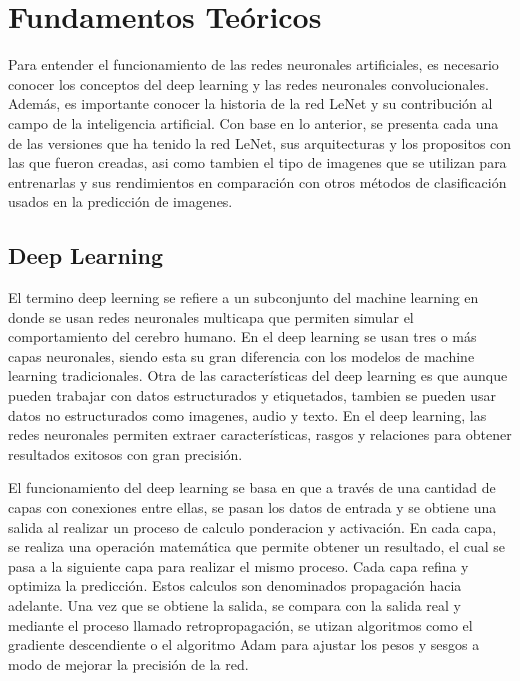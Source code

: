 \section{Fundamentos Teóricos}

Para entender el funcionamiento de las redes neuronales artificiales, 
es necesario conocer los conceptos del deep learning y las redes neuronales
convolucionales. Además, es importante conocer la historia de la red LeNet
y su contribución al campo de la inteligencia artificial. Con base 
en lo anterior, se presenta cada una de las versiones que ha tenido la red
LeNet, sus arquitecturas y los propositos con las que fueron creadas, asi
como tambien el tipo de imagenes que se utilizan para entrenarlas y 
sus rendimientos en comparación con otros métodos de clasificación
usados en la predicción de imagenes.

\subsection{Deep Learning}
El termino deep leerning se refiere a un subconjunto del machine learning
en donde se usan redes neuronales multicapa que permiten simular
el comportamiento del cerebro humano. En el deep learning se usan
tres o más capas neuronales, siendo esta su gran diferencia con los
modelos de machine learning tradicionales. Otra de las características
del deep learning es que aunque pueden trabajar con datos estructurados
y etiquetados, tambien se pueden usar datos no estructurados como imagenes,
audio y texto. En el deep learning, las redes neuronales permiten 
extraer características, rasgos y relaciones para obtener resultados
exitosos con gran precisión. 

El funcionamiento del deep learning se basa en que a través de 
una cantidad de capas con conexiones entre ellas, se pasan los datos
de entrada y se obtiene una salida al realizar un proceso de calculo
ponderacion y activación. En cada capa, se realiza una operación
matemática que permite obtener un resultado, el cual se pasa a la
siguiente capa para realizar el mismo proceso. Cada capa refina y 
optimiza la predicción. Estos calculos son denominados propagación
hacia adelante. Una vez que se obtiene la salida, se compara con
la salida real y mediante el proceso llamado retropropagación, se
utizan algoritmos como el gradiente descendiente o el algoritmo Adam
para ajustar los pesos y sesgos a modo de mejorar la precisión de la red.

